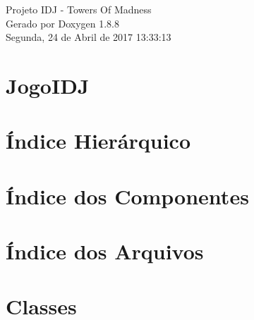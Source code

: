 \documentclass[twoside]{book}
\newcommand{\+}{\discretionary{\mbox{\scriptsize$\hookleftarrow$}}{}{}}
\newcommand{\clearemptydoublepage}{%
  \newpage{\pagestyle{empty}\cleardoublepage}%
}
\begin{document}
\hypersetup{pageanchor=false,
             bookmarks=true,
             bookmarksnumbered=true,
             pdfencoding=unicode
            }
\begin{titlepage}
\vspace*{7cm}
\begin{center}%
{\Large Projeto I\+D\+J -\/ Towers Of Madness }\\
\vspace*{1cm}
{\large Gerado por Doxygen 1.8.8}\\
\vspace*{0.5cm}
{\small Segunda, 24 de Abril de 2017 13:33:13}\\
\end{center}
\end{titlepage}
\clearemptydoublepage
\tableofcontents
\clearemptydoublepage
{}
\hypersetup{pageanchor=true}

\chapter{Jogo\+I\+D\+J}
\label{md_README}
\hypertarget{md_README}{}

\chapter{Índice Hierárquico}

\chapter{Índice dos Componentes}

\chapter{Índice dos Arquivos}

\chapter{Classes}


























\end{document}
